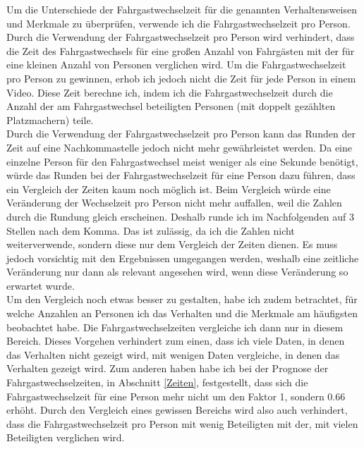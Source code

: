 Um die Unterschiede der Fahrgastwechselzeit für die genannten Verhaltensweisen und Merkmale zu überprüfen, verwende ich die Fahrgastwechselzeit pro Person. Durch die Verwendung der Fahrgastwechselzeit pro Person wird verhindert, dass die Zeit des Fahrgastwechsels für eine großen Anzahl von Fahrgästen mit der für eine kleinen Anzahl von Personen verglichen wird. Um die Fahrgastwechselzeit pro Person zu gewinnen, erhob ich jedoch nicht die Zeit für jede Person in einem Video. Diese Zeit berechne ich, indem ich die Fahrgastwechselzeit durch die Anzahl der am Fahrgastwechsel beteiligten Personen (mit doppelt gezählten Platzmachern) teile. \\
Durch die Verwendung der Fahrgastwechselzeit pro Person kann das Runden der Zeit auf eine Nachkommastelle jedoch nicht mehr gewährleistet werden. Da eine einzelne Person für den Fahrgastwechsel meist weniger als eine Sekunde benötigt, würde das Runden bei der Fahrgastwechselzeit für eine Person dazu führen, dass ein Vergleich der Zeiten kaum noch möglich ist. Beim Vergleich würde eine Veränderung der Wechselzeit pro Person nicht mehr auffallen, weil die Zahlen durch die Rundung gleich erscheinen. Deshalb runde ich im Nachfolgenden auf 3 Stellen nach dem Komma. Das ist zulässig, da ich die Zahlen nicht weiterverwende, sondern diese nur dem Vergleich der Zeiten dienen. Es muss jedoch vorsichtig mit den Ergebnissen umgegangen werden, weshalb eine zeitliche Veränderung nur dann als relevant angesehen wird, wenn diese Veränderung so erwartet wurde. \\
Um den Vergleich noch etwas besser zu gestalten, habe ich zudem betrachtet, für welche Anzahlen an Personen ich das Verhalten und die Merkmale am häufigsten beobachtet habe. Die Fahrgastwechselzeiten vergleiche ich dann nur in diesem Bereich. Dieses Vorgehen verhindert zum einen, dass ich viele Daten, in denen das Verhalten nicht gezeigt wird, mit wenigen Daten vergleiche, in denen das Verhalten gezeigt wird. Zum anderen haben habe ich bei der Prognose der Fahrgastwechselzeiten, in Abschnitt \ref{Zeiten}, festgestellt, dass sich die Fahrgastwechselzeit für eine Person mehr nicht um den Faktor 1, sondern 0.66 erhöht. Durch den Vergleich eines gewissen Bereichs wird also auch verhindert, dass die Fahrgastwechselzeit pro Person mit wenig Beteiligten mit der, mit vielen Beteiligten verglichen wird. 


